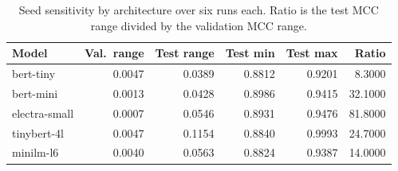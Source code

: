 \begin{table}[htbp]
\centering
\caption{Seed sensitivity by architecture over six runs each. Ratio is the test MCC range divided by the validation MCC range.}
\label{tab:variance}
\small
\begin{tabular}{lrrrrr}
\toprule
Model & Val.\ range & Test range & Test min & Test max & Ratio \\
\midrule
bert-tiny & 0.0047 & 0.0389 & 0.8812 & 0.9201 & 8.3000 \\
bert-mini & 0.0013 & 0.0428 & 0.8986 & 0.9415 & 32.1000 \\
electra-small & 0.0007 & 0.0546 & 0.8931 & 0.9476 & 81.8000 \\
tinybert-4l & 0.0047 & 0.1154 & 0.8840 & 0.9993 & 24.7000 \\
minilm-l6 & 0.0040 & 0.0563 & 0.8824 & 0.9387 & 14.0000 \\
\bottomrule
\end{tabular}
\end{table}
